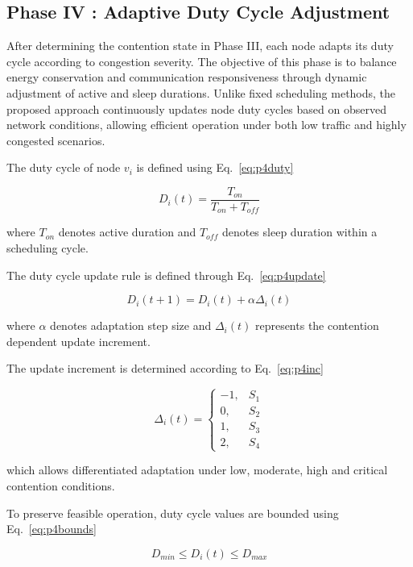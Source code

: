 \documentclass[a4paper,fleqn,final,1p]{cas-dc}
\numberwithin{equation}{section}
\begin{document}
\subsection{Phase IV : Adaptive Duty Cycle Adjustment}

After determining the contention state in Phase III, each node adapts its duty cycle according to congestion severity. The objective of this phase is to balance energy conservation and communication responsiveness through dynamic adjustment of active and sleep durations. Unlike fixed scheduling methods, the proposed approach continuously updates node duty cycles based on observed network conditions, allowing efficient operation under both low traffic and highly congested scenarios.

The duty cycle of node $v_i$ is defined using Eq.~\ref{eq:p4duty}

\begin{equation}
D_i(t)=
\frac{
T_{on}
}{
T_{on}+T_{off}
}
\label{eq:p4duty}
\end{equation}

where $T_{on}$ denotes active duration and $T_{off}$ denotes sleep duration within a scheduling cycle.

The duty cycle update rule is defined through Eq.~\ref{eq:p4update}

\begin{equation}
D_i(t+1)=
D_i(t)
+
\alpha
\Delta_i(t)
\label{eq:p4update}
\end{equation}

where $\alpha$ denotes adaptation step size and $\Delta_i(t)$ represents the contention dependent update increment.

The update increment is determined according to Eq.~\ref{eq:p4inc}

\begin{equation}
\Delta_i(t)=
\begin{cases}
-1, & S_1 \\
0, & S_2 \\
1, & S_3 \\
2, & S_4
\end{cases}
\label{eq:p4inc}
\end{equation}

which allows differentiated adaptation under low, moderate, high and critical contention conditions.

To preserve feasible operation, duty cycle values are bounded using Eq.~\ref{eq:p4bounds}

\begin{equation}
D_{min}
\le
D_i(t)
\le
D_{max}
\label{eq:p4bounds}
\end{equation}
\end{document}
